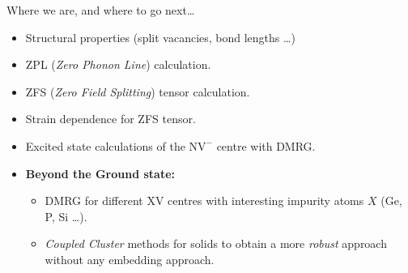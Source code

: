 
\begin{frame}{Where we are, and where to go next\ldots} %
  \begin{itemize}
    \item
      Structural properties (split vacancies, bond lengths \ldots)
    \item
      ZPL (\textit{Zero Phonon Line}) calculation.
    \item
      ZFS (\textit{Zero Field Splitting}) tensor calculation.
    \item
      Strain dependence for ZFS tensor.
    \item
      Excited state calculations of the $ \mathrm{NV}^{-} $ centre with DMRG\@.
    \item
      \textbf{Beyond the Ground state:}\\
      \begin{itemize}
        \item
          DMRG for different $ \mathrm{XV} $ centres with interesting impurity
          atoms $ X $ (Ge, P, Si \ldots).
        \item
          \textit{Coupled Cluster} methods for solids to obtain a more
          \textit{robust} approach without any embedding approach.
      \end{itemize}
  \end{itemize}
\end{frame}
